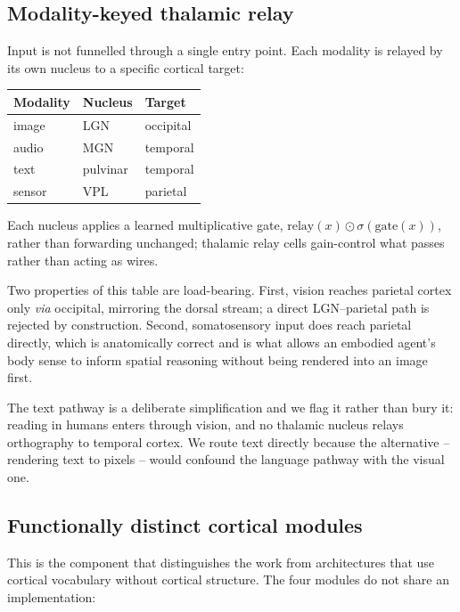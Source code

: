 \documentclass[conference]{IEEEtran}
\begin{document}
\subsection{Modality-keyed thalamic relay}
\label{sec:thalamus}

Input is not funnelled through a single entry point. Each modality is relayed
by its own nucleus to a specific cortical target:
\begin{center}
\begin{tabular}{lll}
\toprule
Modality & Nucleus & Target \\
\midrule
image  & LGN      & occipital \\
audio  & MGN      & temporal  \\
text   & pulvinar & temporal  \\
sensor & VPL      & parietal  \\
\bottomrule
\end{tabular}
\end{center}

Each nucleus applies a learned multiplicative gate,
$\mathrm{relay}(x)\odot\sigma(\mathrm{gate}(x))$, rather than forwarding
unchanged; thalamic relay cells gain-control what passes rather than acting as
wires.

Two properties of this table are load-bearing. First, vision reaches parietal
cortex only \emph{via} occipital, mirroring the dorsal stream; a direct
LGN--parietal path is rejected by construction. Second, somatosensory input
does reach parietal directly, which is anatomically correct and is what allows
an embodied agent's body sense to inform spatial reasoning without being
rendered into an image first.

The text pathway is a deliberate simplification and we flag it rather than
bury it: reading in humans enters through vision, and no thalamic nucleus
relays orthography to temporal cortex. We route text directly because the
alternative -- rendering text to pixels -- would confound the language pathway
with the visual one.

\subsection{Functionally distinct cortical modules}

This is the component that distinguishes the work from architectures that use
cortical vocabulary without cortical structure. The four modules do not share
an implementation:
\end{document}
